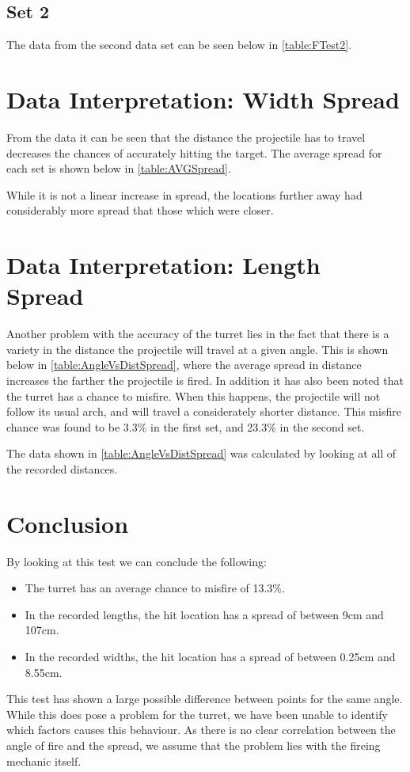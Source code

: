 \subsection{Set 2}
The data from the second data set can be seen below in \autoref{table:FTest2}. 

\section{Data Interpretation: Width Spread}
From the data it can be seen that the distance the projectile has to travel
decreases the chances of accurately hitting the target. The average spread for
each set is shown below in \autoref{table:AVGSpread}.


While it is not a linear increase in spread, the locations further away had
considerably more spread that those which were closer. 

\section{Data Interpretation: Length Spread}
Another problem with the accuracy of the turret lies in the fact that there is a
variety in the distance the projectile will travel at a given angle. This is shown below in
\autoref{table:AngleVsDistSpread}, where the average spread in distance
increases the farther the projectile is fired. In addition it has also been noted that
the turret has a chance to misfire. When this happens, the projectile will not
follow its usual arch, and will travel a considerately shorter distance. This
misfire chance was found to be 3.3\% in the first set, and 23.3\% in the second
set.


The data shown in \autoref{table:AngleVsDistSpread} was calculated by looking at
all of the recorded distances. 

\section{Conclusion}
By looking at this test we can conclude the following:
\begin{itemize}
  \item The turret has an average chance to misfire of 13.3\%.
  \item In the recorded lengths, the hit location has a spread of between 9cm
  and 107cm.
  \item In the recorded widths, the hit location has a spread of between 0.25cm
  and 8.55cm.
\end{itemize}

This test has shown a large possible difference between points for the
same angle. While this does pose a problem for the turret, we have been unable
to identify which factors causes this behaviour. As there is no clear
correlation between the angle of fire and the spread, we assume that the problem
lies with the fireing mechanic itself. 
